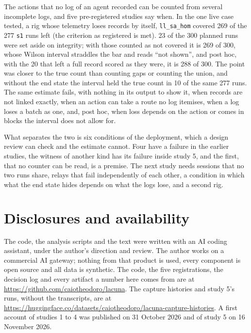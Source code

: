 \documentclass[11pt]{article}
\begin{document}
The actions that no log of an agent recorded can be counted from several incomplete
logs, and five pre-registered studies say when. In the one live case tested, a rig
whose telemetry loses records by itself, \texttt{ll\_sa\_hom} covered 269 of the 277
\texttt{s1} runs left (the criterion as registered is met). 23 of the 300 planned runs
were set aside on integrity; with those counted as not covered it is 269 of 300, whose
Wilson interval straddles the bar and reads ``not shown'', and post hoc, with the 20
that left a full record scored as they were, it is 288 of 300. The point was closer to
the true count than counting gaps or counting the union, and without the end state the
interval held the true count in 10 of the same 277 runs. The same estimate fails, with
nothing in its output to show it, when records are not linked exactly, when an action
can take a route no log itemises, when a log loses a batch as one, and, post hoc, when
loss depends on the action or comes in blocks the interval does not allow for.

What separates the two is six conditions of the deployment, which a design review can
check and the estimate cannot. Four have a failure in the earlier studies, the witness
of another kind has its failure inside study 5, and the first, that no counter can be
read, is a premise. The next study needs sessions that no two runs share, relays that
fail independently of each other, a condition in which what the end state hides depends
on what the logs lose, and a second rig.

\section*{Disclosures and availability}

The code, the analysis scripts and the text were written with an AI coding assistant,
under the author's direction and review. The author works on a commercial AI
gateway; nothing from that product is used, every component is open source and all data
is synthetic. The code, the five registrations, the decision log and every artifact a
number here comes from are at \url{https://github.com/caiotheodoro/lacuna}. The capture
histories and study 5's runs, without the transcripts, are at
\url{https://huggingface.co/datasets/caiotheodoro/lacuna-capture-histories}. A first
account of studies 1 to 4 was published on 31 October 2026 and of study 5 on 16 November
2026.


{\footnotesize\setlength{\bibsep}{0pt}}
\end{document}
